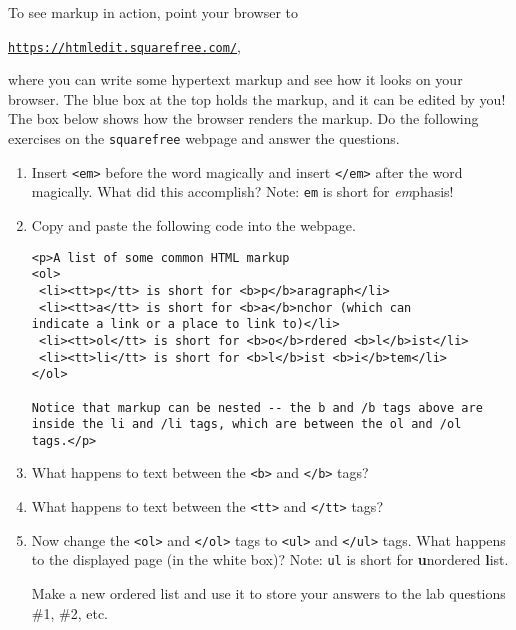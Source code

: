 To see markup in action, point your browser to 

\centerline{ \texttt{\href{https://htmledit.squarefree.com/}{https://htmledit.squarefree.com/}}, }

\noindent where you can write some hypertext markup and see how it looks on
your browser. The blue box at the top holds the markup, and it can
be edited by you! The box below shows how the browser renders the
markup. Do the following exercises on the \texttt{squarefree} webpage
and answer the questions.
\begin{enumerate}
\item Insert \texttt{<em>} before the word magically and insert \texttt{</em>}
after the word magically. What did this accomplish? Note: \texttt{em}
is short for \textit{em}phasis!
\item Copy and paste the following code into the webpage.

\begin{verbatim}
<p>A list of some common HTML markup
<ol>
 <li><tt>p</tt> is short for <b>p</b>aragraph</li>
 <li><tt>a</tt> is short for <b>a</b>nchor (which can
indicate a link or a place to link to)</li>
 <li><tt>ol</tt> is short for <b>o</b>rdered <b>l</b>ist</li>
 <li><tt>li</tt> is short for <b>l</b>ist <b>i</b>tem</li>
</ol>

Notice that markup can be nested -- the b and /b tags above are
inside the li and /li tags, which are between the ol and /ol
tags.</p>
\end{verbatim}


\item What happens to text between the \texttt{<b>} and \texttt{</b>} tags?
\item What happens to text between the \texttt{<tt>} and \texttt{</tt>}
tags?


\item Now change the \texttt{<ol>} and \texttt{</ol>} tags to \texttt{<ul>}
and \texttt{</ul>} tags. What happens to the displayed page (in the
white box)? Note: \texttt{ul} is short for \textbf{u}nordered \textbf{l}ist.

Make a new ordered list and use it to store your answers to the lab questions \#1, \#2, etc.


\end{enumerate}
